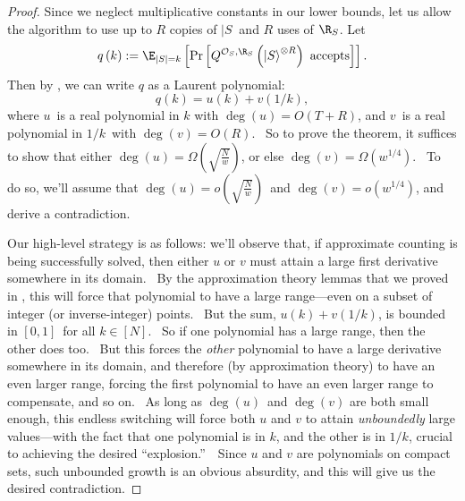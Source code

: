 \begin{proof}
Since we neglect multiplicative constants in our lower bounds, let us allow the algorithm to use up to $R$ copies of $|S\>$ and $R$ uses of $\R_S$.
Let
\begin{equation}
q\left(  k\right)  :=\E_{\left\vert S\right\vert =k}\left[
\Pr\left[  Q^{\mathcal{O}_{S},\R_S}\left(  \left\vert S\right\rangle ^{\otimes
R}\right)  \text{ accepts}\right]  \right]  .
\end{equation}
Then by , we can write $q$ as a Laurent polynomial:
\begin{equation}
q\left(  k\right)  =u\left(  k\right)  +v\left(  1/k\right)  ,
\end{equation}
where $u$\ is a real polynomial in $k$ with $\deg\left(  u\right)  = O(T+R)$,
and $v$\ is a real polynomial in $1/k$\ with $\deg\left(  v\right) = O(R)$.
\ So to prove the theorem, it suffices to show that either $\deg\left(
u\right)  =\Omega\left(  \sqrt{\frac{N}{w}}\right)  $, or else $\deg\left(
v\right)  =\Omega\left(  w^{1/4}\right)  $. \ To do so, we'll assume that
$\deg\left(  u\right)  =o\left(  \sqrt{\frac{N}{w}}\right)  $\ and
$\deg\left(  v\right)  =o\left(  w^{1/4}\right)  $, and derive a contradiction.

Our high-level strategy is as follows: we'll observe that, if approximate
counting is being successfully solved, then either $u$ or $v$ must attain a
large first derivative somewhere in its domain. \ By the approximation theory
lemmas that we proved in , this will force that polynomial to have a large
range---even on a subset of integer (or inverse-integer) points. \ But the
sum, $u\left(  k\right)  +v\left(  1/k\right)  $, is bounded in $\left[
0,1\right]  $\ for all $k\in\left[  N\right]  $. \ So if one polynomial has a
large range, then the other does too. \ But this forces the \textit{other}
polynomial to have a large derivative somewhere in its domain, and therefore
(by approximation theory) to have an even larger range, forcing the first
polynomial to have an even larger range to compensate, and so on. \ As long as
$\deg\left(  u\right)  $\ and $\deg\left(  v\right)  $ are both small enough,
this endless switching will force both $u$ and $v$ to attain
\textit{unboundedly }large values---with the fact that one polynomial is in
$k$, and the other is in $1/k$, crucial to achieving the desired
\textquotedblleft explosion.\textquotedblright\ \ Since $u$ and $v$ are
polynomials on compact sets, such unbounded growth is an obvious absurdity,
and this will give us the desired contradiction.


\end{proof}

